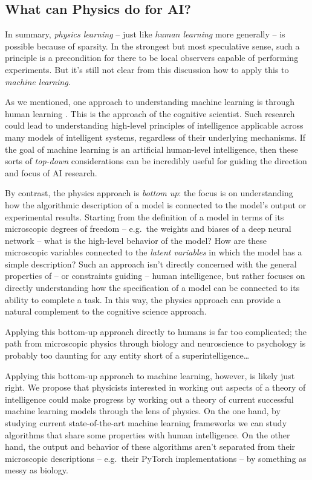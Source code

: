\documentclass[12pt]{article}
\begin{document}
\subsection{What can Physics do for AI?}\label{sec:do}
In summary, \emph{physics learning} -- just like \emph{human learning} more generally -- is possible because of sparsity. In the strongest but most speculative sense, such a principle is a precondition for there to be local observers capable of performing experiments. But it's still not clear from this discussion how to apply this to \emph{machine learning}.






As we mentioned, one approach to understanding machine learning is through human learning \cite{tenenbaum2011grow,lake2017building}. This is the approach of the cognitive scientist.
Such research could lead to understanding high-level principles of intelligence applicable across many models of intelligent systems, regardless of their underlying mechanisms. If the goal of machine learning is an artificial human-level intelligence, then these sorts of \emph{top-down} considerations can be incredibly useful for guiding the direction and focus of AI research.


By contrast, the physics approach is \emph{bottom up}: the focus is on understanding how the algorithmic description of a model is connected to the model's output or experimental results.
Starting from the definition of a model in terms of its microscopic degrees of freedom -- e.g.~the weights and biases of a deep neural network -- what is the high-level behavior of the model? How are these microscopic variables connected to the \emph{latent variables} in which the model has a simple description? Such an approach isn't directly concerned with the general properties of -- or constraints guiding -- human intelligence, but rather focuses on directly understanding how the specification of a model can be connected to its ability to complete a task.
In this way, the physics approach can provide a natural complement to the cognitive science approach.




Applying this bottom-up approach directly to humans is far too complicated; the path from microscopic physics through biology and neuroscience to psychology is probably too daunting for any entity short of a superintelligence\dots

Applying this bottom-up approach to machine learning, however, is likely just right. We propose that physicists interested in working out aspects of a theory of intelligence could make progress by working out a theory of current successful machine learning models through the lens of physics.
On the one hand, by studying current state-of-the-art machine learning frameworks we can study algorithms that share some properties with human intelligence.  On the other hand, the output and behavior of these algorithms aren't separated from their microscopic descriptions -- e.g.~their PyTorch \cite{paszke2017automatic} implementations -- by something as messy as biology. 
\end{document}
